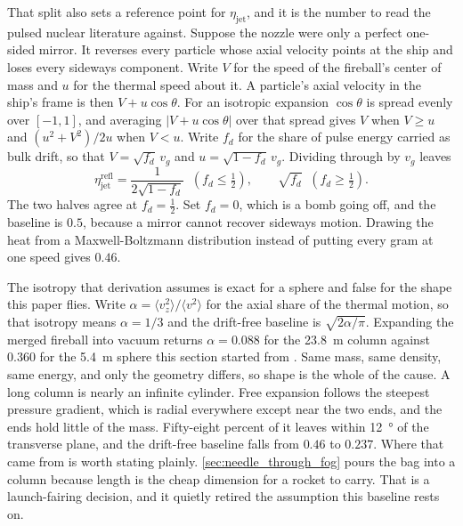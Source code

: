 \documentclass{article}
\begin{document}
That split also sets a reference point for $\eta_{\mathrm{jet}}$, and it is the number to read the pulsed nuclear literature against. Suppose the nozzle were only a perfect one-sided mirror. It reverses every particle whose axial velocity points at the ship and loses every sideways component. Write $V$ for the speed of the fireball's center of mass and $u$ for the thermal speed about it. A particle's axial velocity in the ship's frame is then $V + u\cos\theta$. For an isotropic expansion $\cos\theta$ is spread evenly over $[-1,1]$, and averaging $|V + u\cos\theta|$ over that spread gives $V$ when $V \ge u$ and $(u^2+V^2)/2u$ when $V < u$. Write $f_d$ for the share of pulse energy carried as bulk drift, so that $V = \sqrt{f_d}\,v_g$ and $u = \sqrt{1-f_d}\,v_g$. Dividing through by $v_g$ leaves
\begin{equation}
\eta_{\mathrm{jet}}^{\mathrm{refl}} = \frac{1}{2\sqrt{1-f_d}} \;\; \left(f_d \le \tfrac{1}{2}\right), \qquad \sqrt{f_d} \;\; \left(f_d \ge \tfrac{1}{2}\right).
\label{eq:reflection_baseline}
\end{equation}
The two halves agree at $f_d = \tfrac{1}{2}$. Set $f_d = 0$, which is a bomb going off, and the baseline is $0.5$, because a mirror cannot recover sideways motion. Drawing the heat from a Maxwell-Boltzmann distribution instead of putting every gram at one speed gives $0.46$.

The isotropy that derivation assumes is exact for a sphere and false for the shape this paper flies. Write $\alpha = \langle v_z^2\rangle/\langle v^2\rangle$ for the axial share of the thermal motion, so that isotropy means $\alpha = 1/3$ and the drift-free baseline is $\sqrt{2\alpha/\pi}$. Expanding the merged fireball into vacuum returns $\alpha = 0.088$ for the \SI{23.8}{\meter} column against $0.360$ for the \SI{5.4}{\meter} sphere this section started from \cite{Katz_puffsat_impact_sim_2026}. Same mass, same density, same energy, and only the geometry differs, so shape is the whole of the cause. A long column is nearly an infinite cylinder. Free expansion follows the steepest pressure gradient, which is radial everywhere except near the two ends, and the ends hold little of the mass. Fifty-eight percent of it leaves within \SI{12}{\degree} of the transverse plane, and the drift-free baseline falls from $0.46$ to $0.237$. Where that came from is worth stating plainly. \autoref{sec:needle_through_fog} pours the bag into a column because length is the cheap dimension for a rocket to carry. That is a launch-fairing decision, and it quietly retired the assumption this baseline rests on.
\end{document}
